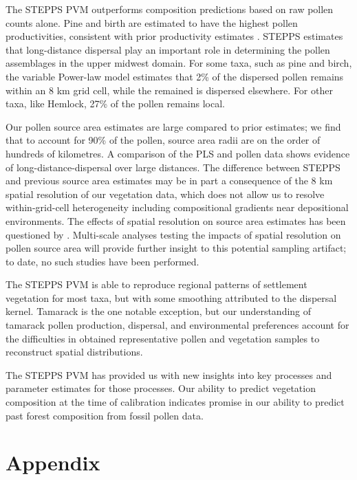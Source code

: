 \documentclass[12pt]{article}
\begin{document}
The STEPPS PVM outperforms composition predictions based on raw pollen
counts alone. Pine and birth are estimated to have the highest pollen
productivities, consistent with prior productivity estimates
\citep{XXX}. STEPPS estimates that long-distance dispersal play an
important role in determining the pollen assemblages in the upper
midwest domain. For some taxa, such as pine and birch, the variable
Power-law model estimates that 2\% of the dispersed pollen remains
within an 8 km grid cell, while the remained is dispersed
elsewhere. For other taxa, like Hemlock, 27\% of the pollen remains
local.

Our pollen source area estimates are large compared to prior
estimates; we find that to account for 90\% of the pollen, source area
radii are on the order of hundreds of kilometres. A comparison of the
PLS and pollen data shows evidence of long-distance-dispersal over
large distances. The difference between STEPPS and previous source
area estimates may be in part a consequence of the 8 km spatial
resolution of our vegetation data, which does not allow us to resolve
within-grid-cell heterogeneity including compositional gradients near
depositional environments. The effects of spatial resolution on source
area estimates has been questioned by
\citet{sugita1994pollen}. Multi-scale analyses testing the impacts of
spatial resolution on pollen source area will provide further insight
to this potential sampling artifact; to date, no such studies have
been performed.


The STEPPS PVM is able to reproduce regional patterns of settlement
vegetation for most taxa, but with some smoothing attributed to the
dispersal kernel. Tamarack is the one notable exception, but our
understanding of tamarack pollen production, dispersal, and
environmental preferences account for the difficulties in obtained
representative pollen and vegetation samples to reconstruct spatial
distributions.

The STEPPS PVM has provided us with new insights into key processes
and parameter estimates for those processes. Our ability to predict
vegetation composition at the time of calibration indicates promise in
our ability to predict past forest composition from fossil pollen
data.




\appendix
\section{Appendix}
\label{append}


\newpage

\end{document}
